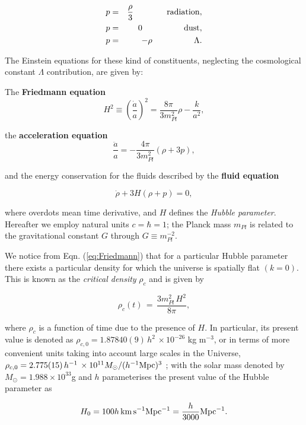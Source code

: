 \documentclass{rmaa}
\def\beq{\begin{equation}}
\def\eeq{\end{equation}}
\begin{document}
\begin{eqnarray}
p&=& \frac{\rho}{3} \qquad \qquad {\rm radiation}, \nonumber \\
p&=&0 \qquad \qquad \quad {\rm dust}, \\
p&=&-\rho \qquad \qquad \quad \Lambda. \nonumber
\end{eqnarray}

\noindent
The Einstein equations for these kind of constituents, neglecting the cosmological 
constant $\Lambda$ contribution, are given by:

\noindent
The {\bf Friedmann equation}
\beq\label{eq:Friedmann}
H^2  \equiv  \left(\frac{\dot a}{a} \right)^2 = \frac{8\pi}{3 m^2_{Pl}} \rho  - \frac{k}{a^2}, 
\eeq

\noindent
the {\bf acceleration equation}
\beq \label{eq:Acce}
\frac{\ddot{a}}{a}  =   - \frac{4\pi }{3 m^2_{Pl}} (\rho +3p),
\eeq

\noindent
and the energy conservation for the fluids described by the {\bf fluid equation}

\begin{equation}
\dot \rho + 3H(\rho + p)=0,
\end{equation}

\noindent
where overdots mean time derivative, and $H$ defines the \textit{Hubble parameter}. Hereafter we employ natural units
$c=\hbar=1$; the Planck mass $m_{Pl}$ is related to the gravitational constant $G$ through $G\equiv m^{-2}_{Pl}$.


We notice from Eqn. (\ref{eq:Friedmann}) that for a particular 
Hubble parameter there exists a particular density for which the universe is spatially flat 
$(k=0)$. This is known as the {\it critical density} $\rho_c$ and is given by

\beq
\rho_c(t)\, =\, \frac{3 m^2_{Pl} \,H^2}{8\pi},
\eeq

\noindent
where $\rho_c$ is a function of time due to the presence of $H$. In particular, its present 
value is denoted as $\rho_{c,0}=1.87840(9)\, h^2\, \times 10^{-26}$ kg m$^{-3}$, 
or in terms of more  convenient units taking into account large scales in the 
Universe,   $\rho_{c,0}= 2.775(15) \, h^{-1}\, \times 10^{11} M_{\odot} /(h^{-1} {\rm Mpc})^3 $ \citep{Apar,Planckck};
with the solar mass denoted by $M_{\odot}=1.988\times 10^{33}$g and $h$ parameterises the present value of the Hubble parameter as

\beq
H_0 = 100 h\, {\rm km\,s}^{-1}{\rm Mpc}^{-1} = \frac{h}{3000}{\rm Mpc}^{-1}.
\eeq
\end{document}
